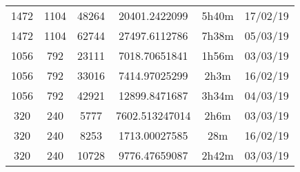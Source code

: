 \begin{center}
\begin{tabular}{ c c c | c c c }
  1472 & 1104 & 48264 & 20401.2422099 & 5h40m & 17/02/19 \\
  1472 & 1104 & 62744 & 27497.6112786 & 7h38m & 05/03/19 \\
  1056 & 792 & 23111 & 7018.70651841 & 1h56m & 03/03/19 \\
  1056 & 792 & 33016 & 7414.97025299 & 2h3m & 16/02/19 \\
  1056 & 792 & 42921 & 12899.8471687 & 3h34m & 04/03/19 \\
  320 & 240 & 5777 & 7602.513247014 & 2h6m & 03/03/19 \\
  320 & 240 & 8253 & 1713.00027585 & 28m & 16/02/19 \\
  320 & 240 & 10728 & 9776.47659087 & 2h42m & 03/03/19 \\
  \end{tabular}
  \end{center}

\newpage
